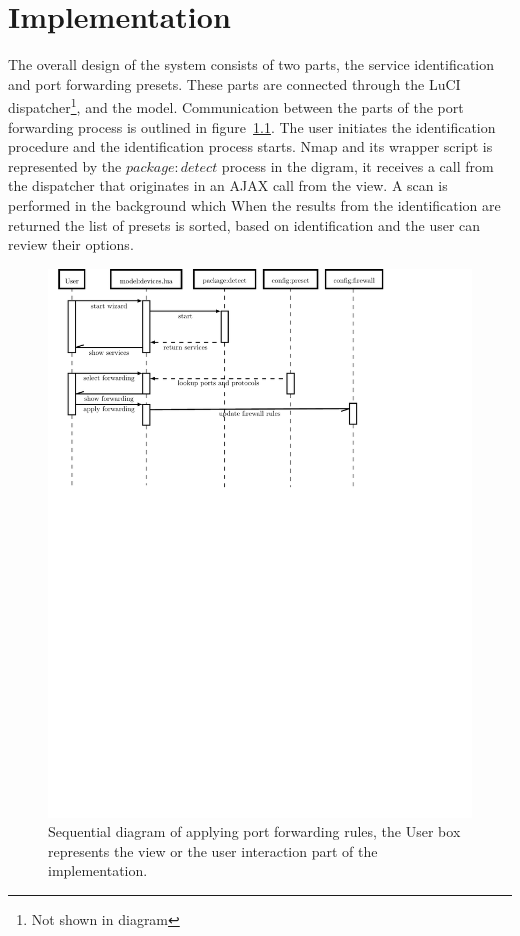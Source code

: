 \documentclass[a4paper,11pt,makeidx]{kth-bcs}
\begin{document}
\chapter{Implementation}
The overall design of the system consists of two parts, the service identification and port forwarding presets.
These parts are connected through the LuCI dispatcher\footnote{Not shown in diagram}, and the model.
Communication between the parts of the port forwarding process is outlined in figure~\ref{fig:wizard-seq_dia}.
The user initiates the identification procedure and the identification process starts.
Nmap and its wrapper script is represented by the $package:detect$ process in the digram, it receives a call from the dispatcher that originates in an AJAX call from the view.
A scan is performed in the background which %
When the results from the identification are returned the list of presets is sorted, based on identification and the user can review their options.

\begin{figure}[h!]
   \centering
   \includegraphics[trim = 0mm 195mm 30mm 0mm, clip, width=15cm,natwidth=1.0in,natheight=1.0in]{wizard-seq_dia}
   \caption{Sequential diagram of applying port forwarding rules, the User box represents the view or the user interaction part of the implementation.}
   \label{fig:wizard-seq_dia}
\end{figure}
\end{document}
